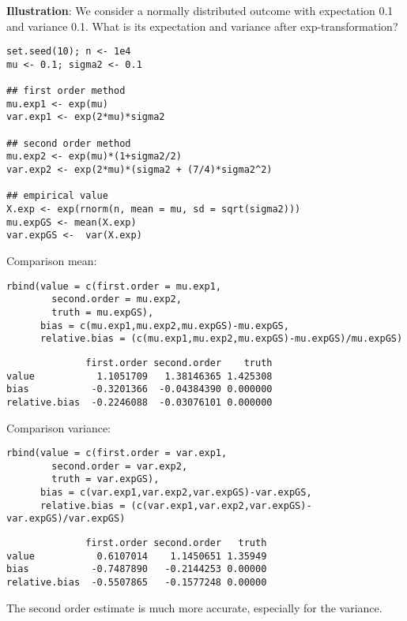 \documentclass[12pt]{article}
\begin{document}
\bigskip


\textbf{Illustration}: We consider a normally distributed outcome with
expectation 0.1 and variance 0.1. What is its expectation and variance
after exp-transformation?
\lstset{language=r,label= ,caption= ,captionpos=b,numbers=none}
\begin{lstlisting}
set.seed(10); n <- 1e4
mu <- 0.1; sigma2 <- 0.1

## first order method
mu.exp1 <- exp(mu)
var.exp1 <- exp(2*mu)*sigma2

## second order method
mu.exp2 <- exp(mu)*(1+sigma2/2)
var.exp2 <- exp(2*mu)*(sigma2 + (7/4)*sigma2^2)

## empirical value
X.exp <- exp(rnorm(n, mean = mu, sd = sqrt(sigma2)))
mu.expGS <- mean(X.exp)
var.expGS <-  var(X.exp)
\end{lstlisting}

Comparison mean:
\lstset{language=r,label= ,caption= ,captionpos=b,numbers=none}
\begin{lstlisting}
rbind(value = c(first.order = mu.exp1, 
		second.order = mu.exp2, 
		truth = mu.expGS),
      bias = c(mu.exp1,mu.exp2,mu.expGS)-mu.expGS,
      relative.bias = (c(mu.exp1,mu.exp2,mu.expGS)-mu.expGS)/mu.expGS)
\end{lstlisting}

\begin{verbatim}
              first.order second.order    truth
value           1.1051709   1.38146365 1.425308
bias           -0.3201366  -0.04384390 0.000000
relative.bias  -0.2246088  -0.03076101 0.000000
\end{verbatim}

Comparison variance:
\lstset{language=r,label= ,caption= ,captionpos=b,numbers=none}
\begin{lstlisting}
rbind(value = c(first.order = var.exp1, 
		second.order = var.exp2, 
		truth = var.expGS),
      bias = c(var.exp1,var.exp2,var.expGS)-var.expGS,
      relative.bias = (c(var.exp1,var.exp2,var.expGS)-var.expGS)/var.expGS)
\end{lstlisting}

\begin{verbatim}
              first.order second.order   truth
value           0.6107014    1.1450651 1.35949
bias           -0.7487890   -0.2144253 0.00000
relative.bias  -0.5507865   -0.1577248 0.00000
\end{verbatim}

The second order estimate is much more accurate, especially for the
variance.
\end{document}
